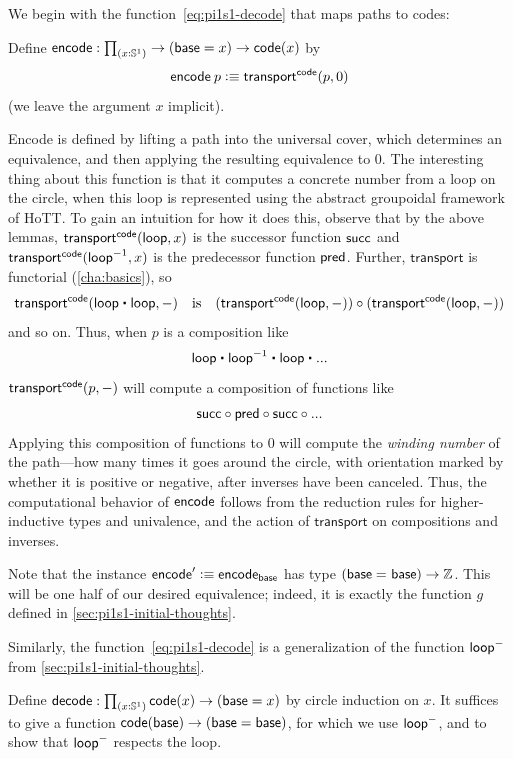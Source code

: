We begin with the function~\eqref{eq:pi1s1-decode} that maps paths to codes:
\begin{defn}
Define $\encode : \prd{x : \Sn ^1} \rightarrow (\base=x) \rightarrow  \code(x)$ by 
\[
\mathsf{encode} \: p \vcentcolon\equiv \mathsf{transport}^{\mathsf{code}}(p,0)
\]
(we leave the argument $x$ implicit).  
\end{defn}
Encode is defined by lifting a path into the universal cover, which
determines an equivalence, and then applying the resulting equivalence
to $0$.  
The interesting thing about this function is that it computes a concrete
number from a loop on the circle, when this loop is represented using
the abstract groupoidal framework of HoTT.  To gain an
intuition for how it does this, observe that by the above lemmas,
$\mathsf{transport}^{\mathsf{code}}(\mathsf{loop},x)$ is the successor function $\mathsf{succ}$ and $\mathsf{transport}^{\mathsf{code}}(\mathord{{\mathsf{loop}}^{-1}},x)$ is the predecessor function $\mathsf{pred}$.
Further, $\mathsf{transport}$ is functorial (\autoref{cha:basics}), so
\[\transfib{\code} {\lloop \ct \lloop}{-}
\quad\text{is}\quad
(\transfib \code \lloop-) \circ (\transfib \code \lloop-)\]
and so on.
Thus, when $p$ is a composition like 
\[
\lloop \ct \opp \lloop \ct \lloop \ct ...
\]
$\mathsf{transport}^{\mathsf{code}}(p,-)$ will compute a composition of functions like
\[
\mathsf{succ} \circ \mathsf{pred} \circ \mathsf{succ} \circ ... 
\]
Applying this composition of functions to 0 will compute the
\emph{winding number} of the path---how many times it goes around the
circle, with orientation marked by whether it is positive or negative,
after inverses have been canceled.  Thus, the computational behavior of
$\mathsf{encode}$ follows from the reduction rules for higher-inductive types and
univalence, and the action of $\mathsf{transport}$ on compositions and inverses.

Note that the instance $\mathsf{encode}' \vcentcolon\equiv \mathsf{encode}_{\mathsf{base}}$ has type 
$(\mathsf{base} =_{} \mathsf{base}) \rightarrow \mathbb{Z}$.
This will be one half of our desired equivalence; indeed, it is exactly the function $g$ defined in \autoref{sec:pi1s1-initial-thoughts}.

Similarly, the function~\eqref{eq:pi1s1-decode} is a generalization of the function $\mathsf{loop}^-$ from \autoref{sec:pi1s1-initial-thoughts}.

\begin{defn}
Define $\decode : \prd{x : \Sn ^1}\code(x) \rightarrow (\base=x)$ by 
circle induction on $x$.  It suffices to give a function 
${\mathsf{code}(\mathsf{base}) \rightarrow (\mathsf{base}=\mathsf{base})}$, for which we use $\mathsf{loop}^-$, and 
to show that $\mathsf{loop}^-$ respects the loop.  
\end{defn}

